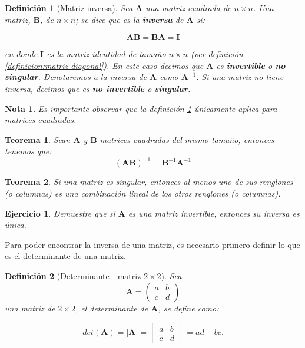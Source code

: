 \documentclass[11pt]{report}
\theoremstyle{break}
\newtheorem{definicion}{Definición}[chapter]
\newtheorem{teorema}{Teorema}[chapter]
\newtheorem{nota}{Nota}[chapter]
\newtheorem{ejercicio}{Ejercicio}[chapter]
\theoremstyle{break}
\newcommand{\matdim}[2]{$#1 \times #2$}
\begin{document}
\begin{definicion}[Matriz inversa]
\label{definicion:matriz-inversa}
Sea $\bm{A}$ una matriz cuadrada de \matdim{n}{n}. Una matriz, $\bm{B}$, de \matdim{n}{n}; se dice que es la \textbf{inversa} de $\bm{A}$ si:

$$ \bm{A} \bm{B} = \bm{B} \bm{A} = \bm{I} $$

en donde $\bm{I}$ es la matriz identidad de tamaño \matdim{n}{n} (ver definición \ref{definicion:matriz-diagonal}). En este caso decimos que $\bm{A}$ es \textbf{invertible} o \textbf{no singular}.
Denotaremos a la inversa de $\bm{A}$ como $\bm{A}^{-1}$. Si una matriz no tiene inversa, decimos que es \textbf{no invertible} o \textbf{singular}.
\end{definicion}

\begin{nota}
Es importante observar que la definición \ref{definicion:matriz-inversa} únicamente aplica para matrices cuadradas.
\end{nota}

\begin{teorema}
\label{teorema:inversa-producto}
Sean $\bm{A}$ y $\bm{B}$ matrices cuadradas del mismo tamaño, entonces tenemos que:
$$ (\bm{A} \bm{B})^{-1} = \bm{B}^{-1} \bm{A}^{-1}$$
\end{teorema}

\begin{teorema}
Si una matriz es singular, entonces al menos uno de sus renglones (o columnas) es una combinación lineal de los otros renglones (o columnas).
\end{teorema}

\begin{ejercicio}
Demuestre que si $\bm{A}$ es una matriz invertible, entonces su inversa es única.
\end{ejercicio}

Para poder encontrar la inversa de una matriz, es necesario primero definir lo que es el determinante de una matriz.

\begin{definicion}[Determinante - matriz \matdim{2}{2}]
\label{definicion:determinante-2x2}
Sea
$$
\bm{A} = 
\begin{pmatrix}
a & b \\
c & d
\end{pmatrix}
$$
una matriz de \matdim{2}{2}, el determinante de $\bm{A}$, se define como:

$$det(\bm{A}) = \left| \bm{A} \right| =
\begin{vmatrix}
a & b \\
c & d
\end{vmatrix}
= ad -bc.
$$
\end{definicion}
\end{document}
